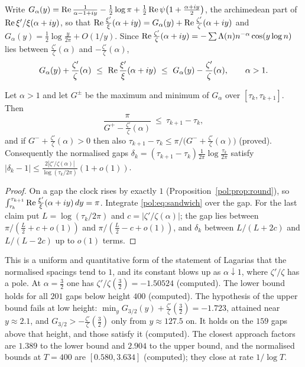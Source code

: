 Write $G_\alpha(y)=\operatorname{Re}\frac1{\alpha-1+iy}-\frac12\log\pi+\frac12\operatorname{Re}\psi\big(1+\frac{\alpha+iy}2\big)$, the archimedean part of $\operatorname{Re}\xi'/\xi(\alpha+iy)$, so that $\operatorname{Re}\frac{\xi'}\xi(\alpha+iy)=G_\alpha(y)+\operatorname{Re}\frac{\zeta'}\zeta(\alpha+iy)$ and $G_\alpha(y)=\frac12\log\frac y{2\pi}+O(1/y)$. Since $\operatorname{Re}\frac{\zeta'}\zeta(\alpha+iy)=-\sum\Lambda(n)n^{-\alpha}\cos(y\log n)$ lies between $\frac{\zeta'}\zeta(\alpha)$ and $-\frac{\zeta'}\zeta(\alpha)$,
\begin{equation}\label{pol:eq:sandwich}
G_\alpha(y)+\frac{\zeta'}\zeta(\alpha)\ \le\ \re\frac{\xi'}\xi(\alpha+iy)\ \le\ G_\alpha(y)-\frac{\zeta'}\zeta(\alpha),\qquad\alpha>1 .
\end{equation}

\begin{theorem}\label{pol:thm:gaps}
Let $\alpha>1$ and let $G^\pm$ be the maximum and minimum of $G_\alpha$ over $[\tau_k,\tau_{k+1}]$. Then
\[
\frac\pi{G^+-\frac{\zeta'}\zeta(\alpha)}\ \le\ \tau_{k+1}-\tau_k ,
\]
and if $G^-+\frac{\zeta'}\zeta(\alpha)>0$ then also $\tau_{k+1}-\tau_k\le\pi/\big(G^-+\frac{\zeta'}\zeta(\alpha)\big)$ (proved). Consequently the normalised gaps $\delta_k=(\tau_{k+1}-\tau_k)\frac1{2\pi}\log\frac{\tau_k}{2\pi}$ satisfy $|\delta_k-1|\le\frac{2|\zeta'/\zeta(\alpha)|}{\log(\tau_k/2\pi)}(1+o(1))$.
\end{theorem}

\begin{proof}
On a gap the clock rises by exactly $1$ (Proposition~\ref{pol:prop:round}), so $\int_{\tau_k}^{\tau_{k+1}}\operatorname{Re}\frac{\xi'}\xi(\alpha+iy)\,dy=\pi$. Integrate \eqref{pol:eq:sandwich} over the gap. For the last claim put $L=\log(\tau_k/2\pi)$ and $c=|\zeta'/\zeta(\alpha)|$; the gap lies between $\pi/(\frac L2+c+o(1))$ and $\pi/(\frac L2-c+o(1))$, and $\delta_k$ between $L/(L+2c)$ and $L/(L-2c)$ up to $o(1)$ terms.
\end{proof}

This is a uniform and quantitative form of the statement of Lagarias \cite{Lagarias05} that the normalised spacings tend to $1$, and its constant blows up as $\alpha\downarrow1$, where $\zeta'/\zeta$ has a pole. At $\alpha=\frac32$ one has $\zeta'/\zeta(\frac32)=-1.50524$ (computed). The lower bound holds for all $201$ gaps below height $400$ (computed). The hypothesis of the upper bound fails at low height: $\min_yG_{3/2}(y)+\frac{\zeta'}\zeta(\frac32)=-1.723$, attained near $y\approx2.1$, and $G_{3/2}>-\frac{\zeta'}\zeta(\frac32)$ only from $y\approx127.5$ on. It holds on the $159$ gaps above that height, and those satisfy it (computed). The closest approach factors are $1.389$ to the lower bound and $2.904$ to the upper bound, and the normalised bounds at $T=400$ are $[0.580,3.634]$ (computed); they close at rate $1/\log T$.

